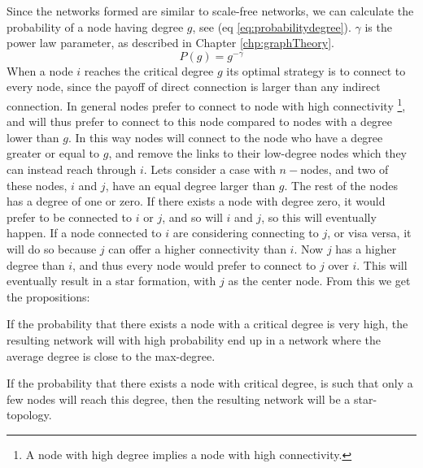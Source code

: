 Since the networks formed are similar to scale-free networks, we can calculate the probability of a node having degree $g$, see (eq \ref{eq:probabilitydegree}). $\gamma$ is the power law parameter, as described in Chapter \ref{chp:graphTheory}.
\begin{equation}
P(g)=g^{-\gamma}
\label{eq:probabilitydegree}
\end{equation}
When a node $i$ reaches the critical degree $g$ its optimal strategy is to connect to every node, since the payoff of direct connection is larger than any indirect connection. In general nodes prefer to connect to node with high connectivity \footnote{A node with high degree implies a node with high connectivity.}, and will thus prefer to connect to this node compared to nodes with a degree lower than $g$. In this way nodes will connect to the node who have a degree greater or equal to $g$, and remove the links to their low-degree nodes which they can instead reach through  $i$.
Lets consider a case with $n-$nodes, and two of these nodes, $i$ and $j$, have an equal degree larger than $g$. The rest of the nodes has a degree of one or zero. If there exists a node with degree zero, it would prefer to be connected to $i$ or $j$, and so will $i$ and $j$, so this will eventually happen.
If a node connected to $i$ are considering connecting to $j$, or visa versa, it will do so because $j$ can offer a higher connectivity than $i$. Now $j$ has a higher degree than $i$, and thus every node would prefer to connect to $j$ over $i$. This will eventually result in a star formation, with $j$ as the center node. 
From this we get the propositions:
\begin{proposition}
If the probability that there exists a node with a critical degree is very high, the resulting network will with high probability end up in a network where the average degree is close to the max-degree. 
\label{prop:clique}
\end{proposition}
\begin{proposition}
If the probability that there exists a node with critical degree, is such that only a few nodes will reach this degree, then the resulting network will be a star-topology. 
\label{prop:star}
\end{proposition} 


